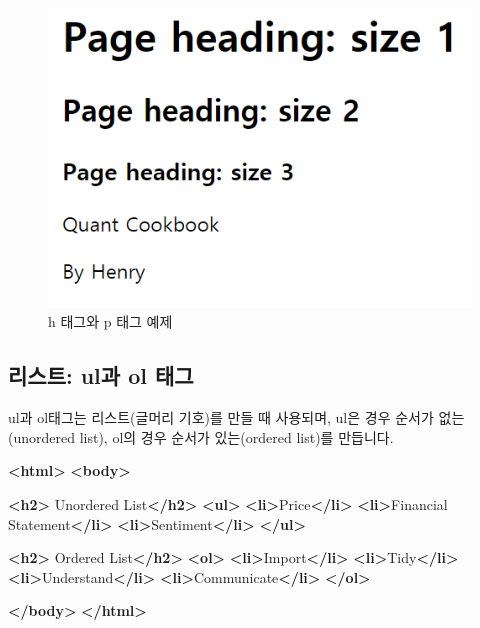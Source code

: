 \documentclass[]{book}
\newenvironment{Shaded}{\begin{snugshade}}{\end{snugshade}}
\newcommand{\KeywordTok}[1]{\textcolor[rgb]{0.13,0.29,0.53}{\textbf{#1}}}
\newcommand{\NormalTok}[1]{#1}
\begin{document}
\begin{figure}

{\centering \includegraphics[width=0.5\linewidth]{images/html_3} 

}

\caption{h 태그와 p 태그 예제}\label{fig:unnamed-chunk-12}
\end{figure}

\hypertarget{ul-ol-}{%
\subsection{리스트: ul과 ol 태그}\label{ul-ol-}}

ul과 ol태그는 리스트(글머리 기호)를 만들 때 사용되며, ul은 경우 순서가 없는(unordered list), ol의 경우 순서가 있는(ordered list)를 만듭니다.

\begin{Shaded}
\begin{Highlighting}[]
\KeywordTok{<html>}
\KeywordTok{<body>}

\KeywordTok{<h2>}\NormalTok{ Unordered List}\KeywordTok{</h2>}
\KeywordTok{<ul>}
  \KeywordTok{<li>}\NormalTok{Price}\KeywordTok{</li>}
  \KeywordTok{<li>}\NormalTok{Financial Statement}\KeywordTok{</li>}
  \KeywordTok{<li>}\NormalTok{Sentiment}\KeywordTok{</li>}
\KeywordTok{</ul>}  

\KeywordTok{<h2>}\NormalTok{ Ordered List}\KeywordTok{</h2>}
\KeywordTok{<ol>}
  \KeywordTok{<li>}\NormalTok{Import}\KeywordTok{</li>}
  \KeywordTok{<li>}\NormalTok{Tidy}\KeywordTok{</li>}
  \KeywordTok{<li>}\NormalTok{Understand}\KeywordTok{</li>}
  \KeywordTok{<li>}\NormalTok{Communicate}\KeywordTok{</li>}
 \KeywordTok{</ol>} 

\KeywordTok{</body>}
\KeywordTok{</html>}
\end{Highlighting}
\end{Shaded}
\end{document}
